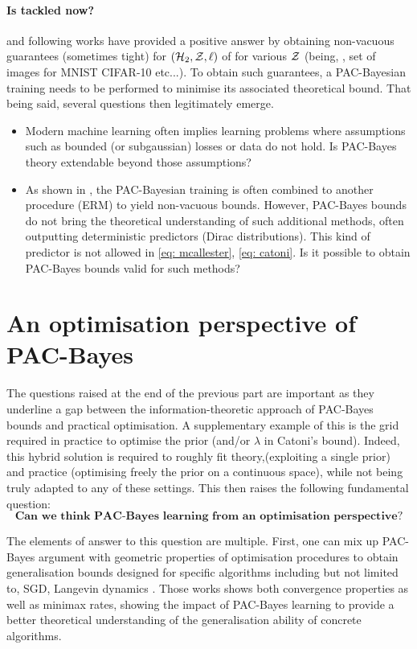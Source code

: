 \paragraph{Is  tackled now?}
\citep{dziugaite2017computing} and following works have provided a positive answer by obtaining non-vacuous guarantees (sometimes tight) for $(\mathcal{H}_2,\mathcal{Z},\ell)$ of  for various $\mathcal{Z}$ (being, \eg, set of images for MNIST CIFAR-10 etc...). To obtain such guarantees, a PAC-Bayesian training needs to be performed to minimise its associated theoretical bound. That being said, several questions then legitimately emerge.

\begin{itemize}
  \item Modern machine learning often implies learning problems where assumptions such as bounded (or subgaussian) losses or \iid data do not hold. Is PAC-Bayes theory extendable beyond those assumptions? 
  \item As shown in \citet{dziugaite2017computing}, the PAC-Bayesian training is often combined to another procedure (\eg ERM) to yield non-vacuous bounds. However, PAC-Bayes bounds do not bring the theoretical understanding of such additional methods, often outputting deterministic predictors (\ie Dirac distributions). This kind of predictor is not allowed in \eqref{eq: mcallester}, \eqref{eq: catoni}. Is it possible to obtain PAC-Bayes bounds valid for such methods? 
\end{itemize}



\section{An optimisation perspective of PAC-Bayes}

The questions raised at the end of the previous part are important as they underline a gap between the information-theoretic approach of PAC-Bayes bounds and practical optimisation. A supplementary example of this is the grid required in practice to optimise the prior (and/or $\lambda$ in Catoni's bound). Indeed, this hybrid solution is required to roughly fit theory,(exploiting a single prior) and practice (optimising freely the prior on a continuous space), while not being truly adapted to any of these settings. This then raises the following fundamental question:
\[ \textbf{Can we think PAC-Bayes learning from an optimisation perspective?} \]

The elements of answer to this question are multiple. First, one can mix up PAC-Bayes argument with geometric properties of optimisation procedures to obtain generalisation bounds designed for specific algorithms including but not limited to, SGD, Langevin dynamics  \citep{london2017pac,dziugaite2018entropy,neu2021info,clerico2022generalisation,haghifam2023limit,zhou2023toward}. Those works shows both convergence properties as well as minimax rates, showing the impact of PAC-Bayes learning to provide a better theoretical understanding of the generalisation ability of concrete algorithms. 

